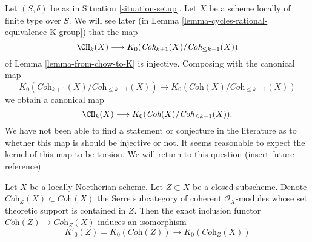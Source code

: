 \begin{remark}
\label{remark-good-cases-K-A}
Let $(S, \delta)$ be as in Situation \ref{situation-setup}.
Let $X$ be a scheme locally of finite type over $S$.
We will see later (in Lemma \ref{lemma-cycles-rational-equivalence-K-group})
that the map
$$
\CH_k(X)
\longrightarrow
K_0(\textit{Coh}_{k + 1}(X)/\textit{Coh}_{\leq k - 1}(X))
$$
of Lemma \ref{lemma-from-chow-to-K} is injective.
Composing with the canonical map
$$
K_0(\textit{Coh}_{k + 1}(X)/\textit{Coh}_{\leq k - 1}(X))
\longrightarrow
K_0(\textit{Coh}(X)/\textit{Coh}_{\leq k - 1}(X))
$$
we obtain a canonical map
$$
\CH_k(X)
\longrightarrow
K_0(\textit{Coh}(X)/\textit{Coh}_{\leq k - 1}(X)).
$$
We have not been able to find a statement or conjecture in the
literature as to whether this map is should be injective or not.
It seems reasonable to expect the kernel of this map to be torsion.
We will return to this question (insert future reference).
\end{remark}

\begin{lemma}
\label{lemma-K-coherent-supported-on-closed}
Let $X$ be a locally Noetherian scheme. Let $Z \subset X$ be a closed
subscheme. Denote $\textit{Coh}_Z(X) \subset \textit{Coh}(X)$
the Serre subcategory of coherent $\mathcal{O}_X$-modules whose
set theoretic support is contained in $Z$. Then the exact inclusion
functor $\textit{Coh}(Z) \to \textit{Coh}_Z(X)$ induces
an isomorphism
$$
K'_0(Z) = K_0(\textit{Coh}(Z)) \longrightarrow K_0(\textit{Coh}_Z(X))
$$
\end{lemma}

